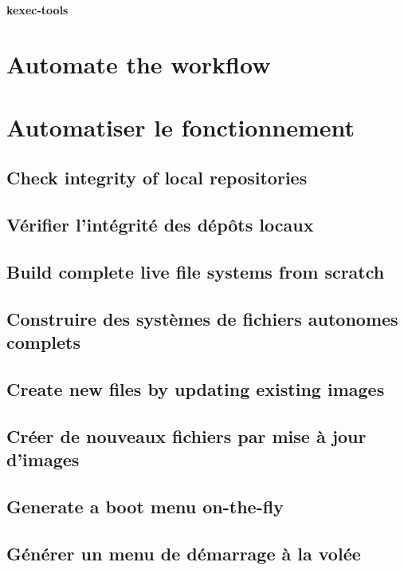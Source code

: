 \paragraph{kexec-tools}

\ml
{\section{Automate the workflow}}
{\section{Automatiser le fonctionnement}}

\ml
{\subsection{Check integrity of local repositories}}
{\subsection{Vérifier l’intégrité des dépôts locaux}}

\ml
{\subsection{Build complete live file systems from scratch}}
{\subsection{Construire des systèmes de fichiers autonomes complets}}

\ml
{\subsection{Create new files by updating existing images}}
{\subsection{Créer de nouveaux fichiers par mise à jour d’images}}

\ml
{\subsection{Generate a boot menu on-the-fly}}
{\subsection{Générer un menu de démarrage à la volée}}

